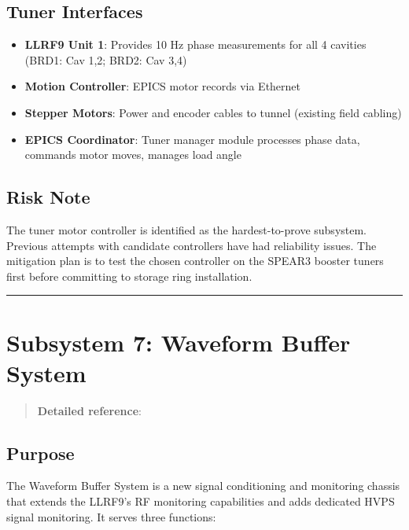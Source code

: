 \subsection{Tuner Interfaces}\label{tuner-interfaces}

\begin{itemize}
\tightlist
\item
  \textbf{LLRF9 Unit 1}: Provides 10 Hz phase measurements for all 4 cavities (BRD1: Cav 1,2; BRD2: Cav 3,4)
\item
  \textbf{Motion Controller}: EPICS motor records via Ethernet
\item
  \textbf{Stepper Motors}: Power and encoder cables to tunnel (existing field cabling)
\item
  \textbf{EPICS Coordinator}: Tuner manager module processes phase data, commands motor moves, manages load angle
\end{itemize}

\subsection{Risk Note}\label{risk-note}

The tuner motor controller is identified as the hardest-to-prove subsystem. Previous attempts with candidate controllers have had reliability issues. The mitigation plan is to test the chosen controller on the SPEAR3 booster tuners first before committing to storage ring installation.

\begin{center}\rule{0.5\linewidth}{0.5pt}\end{center}

\section{Subsystem 7: Waveform Buffer System}\label{subsystem-7-waveform-buffer-system}

\begin{quote}
\textbf{Detailed reference}: 
\end{quote}

\subsection{Purpose}\label{purpose-1}

The Waveform Buffer System is a new signal conditioning and monitoring chassis that extends the LLRF9's RF monitoring capabilities and adds dedicated HVPS signal monitoring. It serves three functions:

